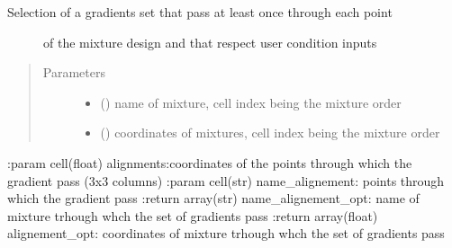 \documentclass[letterpaper,10pt,english]{sphinxmanual}
\begin{document}
\begin{fulllineitems}
\label{\detokenize{ExperimentsPlannification:modules.gradients_set}}\begin{description}
\item[{Selection of a gradients set that pass at least once through each point}] \leavevmode
\sphinxAtStartPar
of the mixture design and that respect user condition inputs

\end{description}
\begin{quote}\begin{description}
\item[{Parameters}] \leavevmode\begin{itemize}
\item {} 
\sphinxAtStartPar
{} () \textendash{} name of mixture, cell index being the mixture order

\item {} 
\sphinxAtStartPar
{} () \textendash{} coordinates of mixtures, cell index being the mixture order 

\end{itemize}

\end{description}\end{quote}

\sphinxAtStartPar
:param cell(float) alignments:coordinates of the points through which the gradient pass (3x3 columns)
:param cell(str) name\_alignement: points through which the gradient pass
:return array(str) name\_alignement\_opt: name of mixture trhough whch the set of gradients pass
:return array(float) alignement\_opt: coordinates of mixture trhough whch the set of gradients pass

\end{fulllineitems}

\label{\detokenize{ExperimentsPlannification:module-modules}}
\end{document}
